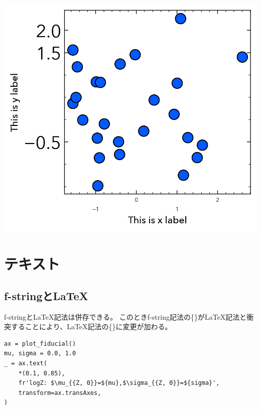 \documentclass[a4paper, 10pt, notitlepage, twocolumn, uplatex, oneside, dvipdfmx]{jsarticle}
\begin{document}
\begin{center}
\includegraphics[width=1.0\linewidth]{./obipy-resources/params_ticks.png}
\end{center}
\section{テキスト}
\label{sec:orgdd51e1e}

\subsection{f-stringと\LaTeX{}}
\label{sec:org863de21}
f-stringと\LaTeX{}記法は併存できる。
このときf-string記法の\{\}が\LaTeX{}記法と衝突することにより、\LaTeX{}記法の\{\}に変更が加わる。
\begin{verbatim}
ax = plot_fiducial()
mu, sigma = 0.0, 1.0
_ = ax.text(
    *(0.1, 0.85),
    fr'logZ: $\mu_{{Z, 0}}=${mu},$\sigma_{{Z, 0}}=${sigma}',
    transform=ax.transAxes,
)
\end{verbatim}
\end{document}
